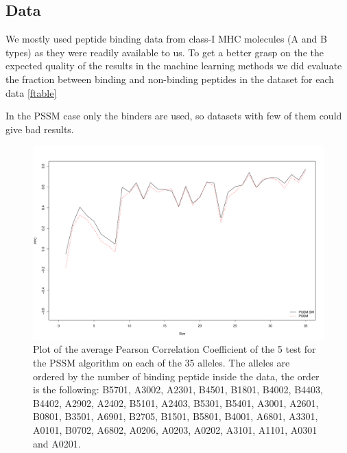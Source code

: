 \subsection*{Data}
We mostly used peptide binding data from class-I MHC molecules (A and B types) as they were readily available to us.
To get a better grasp on the the expected quality of the results in the machine learning methods we did evaluate the fraction between binding and non-binding peptides in the dataset for each data {\ref{ftable}}

In the PSSM case only the binders are used, so datasets with few of them could give bad results.

\begin{figure}[ht]
\begin{center}
\includegraphics[width=18cm]{fig/pssmLN1.pdf}
\caption{Plot of the average Pearson Correlation Coefficient of the 5 test for the PSSM algorithm on each of the 35 alleles. The alleles are ordered by the number of binding peptide inside the data, the order is the following:
B5701, A3002, A2301, B4501, B1801, B4002, B4403, B4402, A2902, A2402, B5101, A2403, B5301, B5401, A3001, A2601, B0801, B3501, A6901, B2705, B1501, B5801, B4001, A6801, A3301, A0101, B0702, A6802, A0206, A0203, A0202, A3101, A1101, A0301 and A0201.}\label{fig:pssm1}
\end{center}
\end{figure}

